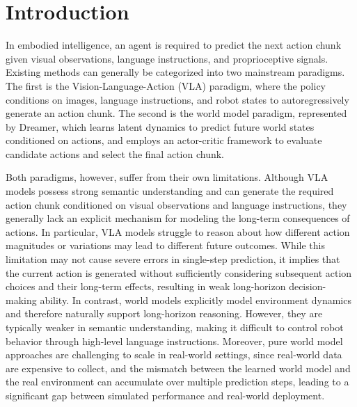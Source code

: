 \section{Introduction}

In embodied intelligence, an agent is required to predict the next action chunk given visual observations, language instructions, and proprioceptive signals. Existing methods can generally be categorized into two mainstream paradigms. The first is the Vision-Language-Action (VLA) paradigm, where the policy conditions on images, language instructions, and robot states to autoregressively generate an action chunk. The second is the world model paradigm, represented by Dreamer, which learns latent dynamics to predict future world states conditioned on actions, and employs an actor-critic framework to evaluate candidate actions and select the final action chunk.

Both paradigms, however, suffer from their own limitations. Although VLA models possess strong semantic understanding and can generate the required action chunk conditioned on visual observations and language instructions, they generally lack an explicit mechanism for modeling the long-term consequences of actions. In particular, VLA models struggle to reason about how different action magnitudes or variations may lead to different future outcomes. While this limitation may not cause severe errors in single-step prediction, it implies that the current action is generated without sufficiently considering subsequent action choices and their long-term effects, resulting in weak long-horizon decision-making ability. In contrast, world models explicitly model environment dynamics and therefore naturally support long-horizon reasoning. However, they are typically weaker in semantic understanding, making it difficult to control robot behavior through high-level language instructions. Moreover, pure world model approaches are challenging to scale in real-world settings, since real-world data are expensive to collect, and the mismatch between the learned world model and the real environment can accumulate over multiple prediction steps, leading to a significant gap between simulated performance and real-world deployment.

